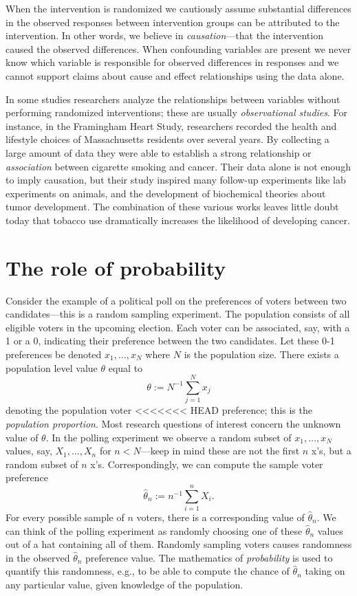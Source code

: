 \documentclass[]{book}
\begin{document}
When the intervention is randomized we cautiously assume substantial
differences in the observed responses between intervention groups can be
attributed to the intervention. In other words, we believe in
\emph{causation}---that the intervention caused the observed
differences. When confounding variables are present we never know which
variable is responsible for observed differences in responses and we
cannot support claims about cause and effect relationships using the
data alone.

In some studies researchers analyze the relationships between variables
without performing randomized interventions; these are usually
\emph{observational studies}. For instance, in the Framingham Heart
Study, researchers recorded the health and lifestyle choices of
Massachusetts residents over several years. By collecting a large amount
of data they were able to establish a strong relationship or
\emph{association} between cigarette smoking and cancer. Their data
alone is not enough to imply causation, but their study inspired many
follow-up experiments like lab experiments on animals, and the
development of biochemical theories about tumor development. The
combination of these various works leaves little doubt today that
tobacco use dramatically increases the likelihood of developing cancer.

\section{The role of probability}\label{the-role-of-probability}

Consider the example of a political poll on the preferences of voters
between two candidates---this is a random sampling experiment. The
population consists of all eligible voters in the upcoming election.
Each voter can be associated, say, with a 1 or a 0, indicating their
preference between the two candidates. Let these 0-1 preferences be
denoted \(x_1, \ldots, x_N\) where \(N\) is the population size. There
exists a population level value \(\theta\) equal to
\[\theta:=N^{-1}\sum_{j=1}^N x_j\] denoting the population voter
<<<<<<< HEAD
preference; this is the \emph{population proportion}. Most research
questions of interest concern the unknown value of \(\theta\). In the
polling experiment we observe a random subset of \(x_1, \ldots, x_N\)
values, say, \(X_1, \ldots, X_n\) for \(n<N\)---keep in mind these are
not the first \(n\) x's, but a random subset of \(n\) x's.
Correspondingly, we can compute the sample voter preference
\[\hat\theta_n := n^{-1}\sum_{i=1}^n X_i.\] For every possible sample of
\(n\) voters, there is a corresponding value of \(\hat\theta_n\). We can
think of the polling experiment as randomly choosing one of these
\(\hat\theta_n\) values out of a hat containing all of them. Randomly
sampling voters causes randomness in the observed \(\hat\theta_n\)
preference value. The mathematics of \emph{probability} is used to
quantify this randomness, e.g., to be able to compute the chance of
\(\hat\theta_n\) taking on any particular value, given knowledge of the
population.
\end{document}
